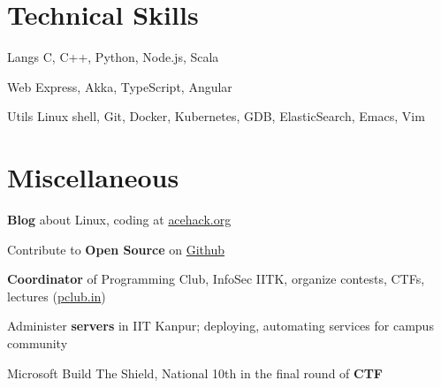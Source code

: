 \documentclass{tccv}
\begin{document}
\vspace{-0.4cm}
\section{Technical Skills}

\begin{factlist}
\item{\small{Langs}}
  {C, C++, Python, Node.js, Scala}

\item{\small{Web}}
  {Express, Akka, TypeScript, Angular}

\item {\small{Utils}}
  {Linux shell, Git, Docker,
    Kubernetes, GDB, ElasticSearch, Emacs, Vim}

\end{factlist}

\vspace{-0.6cm}
\section{Miscellaneous}
\vspace{0.2cm}
\begin{thinitemize}
\item \textbf{Blog} about Linux, coding at \href{http://acehack.org}{acehack.org}
\item Contribute to \textbf{Open Source}
  on \href{https://github.com/sakshamsharma}{Github}
\item \textbf{Coordinator} of Programming Club, InfoSec IITK, organize
  contests, CTFs, lectures (\href{http://pclub.in}{pclub.in})
\item Administer \textbf{servers} in IIT Kanpur; deploying,
  automating services for campus community
\item Microsoft Build The Shield, National 10th in the final round of
  \textbf{CTF}
\end{thinitemize}
\end{document}
